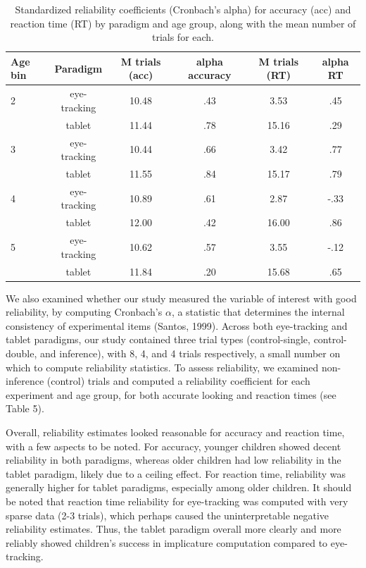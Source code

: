 \documentclass[a4paper,man,apacite,floatsintext]{apa6}
\begin{document}
\begin{table}[tb]
\centering
\begin{tabular}{lccccc}
 Age bin & Paradigm & M trials (acc) & alpha accuracy & M trials (RT) & alpha RT \\ 
  \hline
2 & eye-tracking & 10.48 & .43 & 3.53 & .45 \\ 
    & tablet & 11.44 & .78 & 15.16 & .29 \\ 
  3 & eye-tracking & 10.44 & .66 & 3.42 & .77 \\ 
    & tablet & 11.55 & .84 & 15.17 & .79 \\ 
  4 & eye-tracking & 10.89 & .61 & 2.87 & -.33 \\ 
    & tablet & 12.00 & .42 & 16.00 & .86 \\ 
  5 & eye-tracking & 10.62 & .57 & 3.55 & -.12 \\ 
    & tablet & 11.84 & .20 & 15.68 & .65 \\ 
   \hline
\end{tabular}
\caption{Standardized reliability coefficients (Cronbach's alpha) for accuracy (acc) and reaction time (RT) by paradigm and age group, along with the mean number of trials for each.} 
\label{tab:etip_rel}
\end{table}

We also examined whether our study measured the variable of interest
with good reliability, by computing Cronbach's \(\alpha\), a statistic
that determines the internal consistency of experimental items (Santos,
1999). Across both eye-tracking and tablet paradigms, our study
contained three trial types (control-single, control-double, and
inference), with 8, 4, and 4 trials respectively, a small number on
which to compute reliability statistics. To assess reliability, we
examined non-inference (control) trials and computed a reliability
coefficient for each experiment and age group, for both accurate looking
and reaction times (see Table 5).

Overall, reliability estimates looked reasonable for accuracy and
reaction time, with a few aspects to be noted. For accuracy, younger
children showed decent reliability in both paradigms, whereas older
children had low reliability in the tablet paradigm, likely due to a
ceiling effect. For reaction time, reliability was generally higher for
tablet paradigms, especially among older children. It should be noted
that reaction time reliability for eye-tracking was computed with very
sparse data (2-3 trials), which perhaps caused the uninterpretable
negative reliability estimates. Thus, the tablet paradigm overall more
clearly and more reliably showed children's success in implicature
computation compared to eye-tracking.
\end{document}
